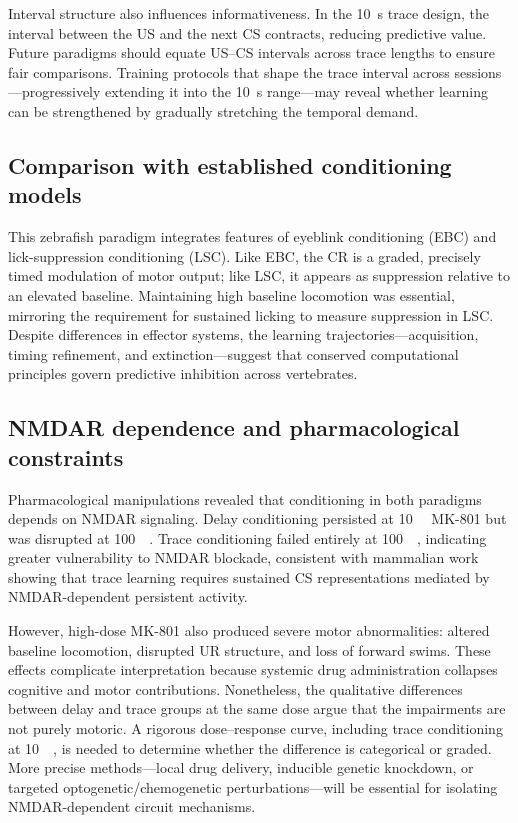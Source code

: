 Interval structure also influences informativeness. In the 10~s trace design, the interval between the US and the next CS contracts, reducing predictive value. Future paradigms should equate US--CS intervals across trace lengths to ensure fair comparisons. Training protocols that shape the trace interval across sessions---progressively extending it into the 10~s range---may reveal whether learning can be strengthened by gradually stretching the temporal demand.

\subsection{Comparison with established conditioning models}

This zebrafish paradigm integrates features of eyeblink conditioning (EBC) and lick-suppression conditioning (LSC). Like EBC, the CR is a graded, precisely timed modulation of motor output; like LSC, it appears as suppression relative to an elevated baseline. Maintaining high baseline locomotion was essential, mirroring the requirement for sustained licking to measure suppression in LSC.
Despite differences in effector systems, the learning trajectories---acquisition, timing refinement, and extinction---suggest that conserved computational principles govern predictive inhibition across vertebrates.

\subsection{NMDAR dependence and pharmacological constraints}

Pharmacological manipulations revealed that conditioning in both paradigms depends on NMDAR signaling. Delay conditioning persisted at 10~\si{\micro\Molar} MK-801 but was disrupted at 100~\si{\micro\Molar}. Trace conditioning failed entirely at 100~\si{\micro\Molar}, indicating greater vulnerability to NMDAR blockade, consistent with mammalian work showing that trace learning requires sustained CS representations mediated by NMDAR-dependent persistent activity.

However, high-dose MK-801 also produced severe motor abnormalities: altered baseline locomotion, disrupted UR structure, and loss of forward swims. These effects complicate interpretation because systemic drug administration collapses cognitive and motor contributions. Nonetheless, the qualitative differences between delay and trace groups at the same dose argue that the impairments are not purely motoric. A rigorous dose--response curve, including trace conditioning at 10~\si{\micro\Molar}, is needed to determine whether the difference is categorical or graded. More precise methods---local drug delivery, inducible genetic knockdown, or targeted optogenetic/chemogenetic perturbations---will be essential for isolating NMDAR-dependent circuit mechanisms.

